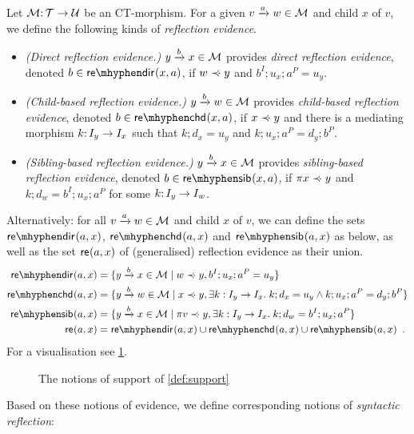 \begin{definition}\label{def:support}
Let ${\mathcal{M}}{:}\, {\mathcal{T}}\rightarrow{\mathcal{U}}$ be an CT-morphism. For a given ${v}\xrightarrow{a}{w}\in{\mathcal{M}}$ and child $x$ of $v$, we define the following kinds of \emph{reflection evidence}.
\begin{itemize}[topsep=\smallskipamount]
\item \emph{(Direct reflection evidence.)} ${y}\xrightarrow{b}{x}\in{\mathcal{M}}$ provides \emph{direct reflection evidence}, denoted $\issdir b{x,a}$, if $w\mathrel{\prec\mskip-8mu\cdot} y$ and $b^I;u_x;a^P=u_y$.
\item \emph{(Child-based reflection evidence.)} ${y}\xrightarrow{b}{w}\in{\mathcal{M}}$ provides \emph{child-based reflection evidence}, denoted $\isschd b{x,a}$, if $x\mathrel{\prec\mskip-8mu\cdot} y$ and there is a mediating morphism $k{:}\, I_y\rightarrow I_x$ such that $k;d_x=u_y$ and $k;u_x;a^P=d_y;b^P$.
\item \emph{(Sibling-based reflection evidence.)} ${y}\xrightarrow{b}{x}\in{\mathcal{M}}$  provides \emph{sibling-based reflection evidence}, denoted $\isssib b{x,a}$, if $\pi{x}\mathrel{\prec\mskip-8mu\cdot} y$ and $k;d_w=b^I;u_x;a^P$ for some $k{:}\, I_y\rightarrow I_w$.
\end{itemize}
\end{definition}
%
Alternatively: for all ${v}\xrightarrow{a}{w}\in{\mathcal{M}}$ and child $x$ of $v$, we can define the sets $\sdir{a,x}$, $\schd{a,x}$ and $\ssib{a,x}$ as below, as well as the set $\mathsf{re}_{}(a,x)$ of (generalised) reflection evidence as their union.
%
\begin{align*}
\sdir{a,x} ={} & \gensetof{\trip ybx\in \cM}{w\parentof y, b^I;u_x;a^P=u_y} \\
\schd{a,x} ={} & \gensetof{\trip ybw\in \cM}{x\parentof y, \exists k:I_y\to I_x\st k;d_x=u_y\wedge k;u_x;a^P=d_y;b^P} \\
\ssib{a,x} ={} & \gensetof{\trip ybx\in \cM}{\parent v\parentof y, \exists k:I_y\to I_x\st k;d_w=b^I;u_x;a^P} \\
\re{a,x} ={} & \sdir{a,x}\cup \schd{a,x} \cup \ssib{a,x} \enspace.
\end{align*}
%
For a visualisation see \cref{fig:source-support}.
%
\begin{figure}
	
	\caption{The notions of support of \cref{def:support}}
	\label{fig:source-support}
\end{figure}
%
Based on these notions of evidence, we define corresponding notions of \emph{syntactic reflection}:

